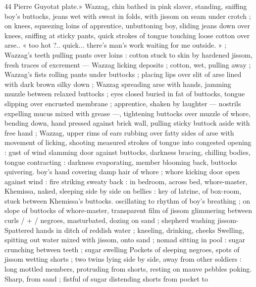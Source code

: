 44 Pierre Guyotat
plate.» Wazzag, chin bathed in pink slaver, standing, sniffing boy's
buttocks, jeans wet with sweat in folds, with jissom on seam under
crotch ; on knees, squeezing loins of apprentice, unbuttoning boy,
sliding jeans down over knees, sniffing at sticky pants, quick strokes
of tongue touching loose cotton over arse.. « too hot ?.. quick...
there's man’s work waiting for me outside. » ; Wazzag's teeth pulling
pants over loins : cotton stuck to skin by hardened jissom, fresh
traces of excrement — Wazzag licking deposits ; cotton, wet, pulling
away ; Wazzag's fists rolling pants under buttocks ; placing lips over
slit of arse lined with dark brown silky down ; Wazzag spreading arse
with hands, jamming muzzle between relaxed buttocks ; eyes closed
buried in fat of buttocks, tongue slipping over encrusted membrane
; apprentice, shaken by laughter — nostrils expelling mucus mixed
with grease —, tightening buttocks over muzzle of whore, bending
down, hand pressed against brick wall, pulling sticky buttock aside
with free hand ; Wazzag, upper rims of ears rubbing over fatty sides
of arse with movement of licking, shooting measured strokes of
tongue into congested opening : gust of wind slamming door against
buttocks, darkness bracing, chilling bodies, tongue contracting :
darkness evaporating, member blooming back, buttocks quivering.
boy's hand covering damp hair of whore ; whore kicking door open
against wind : fire striking sweaty back : in bedroom, across bed,
whore-master, Khemissa, naked, sleeping side by side on bellies :
key of latrine, of box-room, stuck between Khemissa’s buttocks.
oscillating to rhythm of boy's breathing ; on slope of buttocks of
whore-master, transparent film of jissom glimmering between curls /
+ / negroes, masturbated, dozing on sand ; shepherd washing jissom-
Spattered hands in ditch of reddish water ; kneeling, drinking, cheeks
Swelling, spitting out water mixed with jissom, onto sand ; nomad
sitting in pool : sugar crunching between teeth ; sugar swelling
Pockets of sleeping negroes, spots of jissom wetting shorts ; two
twins lying side by side, away from other soldiers : long mottled
members, protruding from shorts, resting on mauve pebbles poking.
Sharp, from sand ; fistful of sugar distending shorts from pocket to

